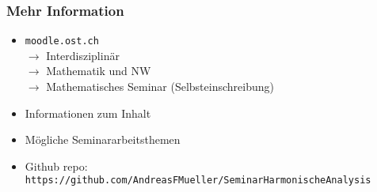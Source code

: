%
%
%
\bgroup
\begin{frame}[t]
\setlength{\abovedisplayskip}{5pt}
\setlength{\belowdisplayskip}{5pt}
\frametitle{Mehr Information}
\begin{itemize}
\item \texttt{moodle.ost.ch}\\
$\rightarrow$ Interdisziplinär\\
$\rightarrow$ Mathematik und NW\\
$\rightarrow$ Mathematisches Seminar
(Selbsteinschreibung)
\item<2-> Informationen zum Inhalt
\item<3-> Mögliche Seminararbeitsthemen
\item<4-> Github repo: \texttt{https://github.com/AndreasFMueller/SeminarHarmonischeAnalysis}
\end{itemize}
\end{frame}
\egroup
